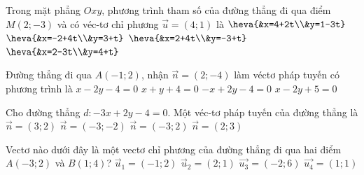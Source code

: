 

\begin{ex}%
	Trong mặt phẳng $Oxy$, phương trình tham số của đường thẳng đi qua điểm $M(2;-3)$ và có  véc-tơ chỉ phương $\overrightarrow{u}=(4;1)$ là
	 \choice
		{$\heva{&x=4+2t\\&y=1-3t}$} 
		 {$\heva{&x=-2+4t\\&y=3+t}$}
		 {\True $\heva{&x=2+4t\\&y=-3+t}$}
		 {$\heva{&x=2-3t\\&y=4+t}$}
\end{ex}

\begin{ex}%
	Đường thẳng đi qua $A(-1; 2)$, nhận $\overrightarrow{n}=(2;-4)$ làm véctơ pháp tuyến có phương trình  là
	\choice 
		{$x-2y-4=0$} 
		{$x+y+4=0$} 
		 {$-x+2y-4=0$}
		{\True $x-2y+5=0$} 
\end{ex}

\begin{ex}%
	Cho đường thẳng  $d\colon-3x+2y-4=0$. Một véc-tơ pháp tuyến của đường thẳng là
	 \choice
		{$\overrightarrow{n}=\left(3;2\right)$} 
		 {$\overrightarrow{n}=\left(-3;-2\right)$}
		{\True $\overrightarrow{n}=\left(-3;2\right)$} 
		{$\overrightarrow{n}=\left(2;3\right)$} 
\end{ex}

\begin{ex}%
	Vectơ nào dưới đây  là một vectơ chỉ phương của đường thẳng đi qua hai điểm $A(-3; 2)$ và $B(1; 4)$?
	\choice 
		 {$\overrightarrow{u}_1=(-1; 2)$}
		{\True $\overrightarrow{u}_2=(2; 1)$} 
		{$\overrightarrow{u_3}=(-2; 6)$} 
		{$\overrightarrow{u_4}=(1;  1)$}
\end{ex}

